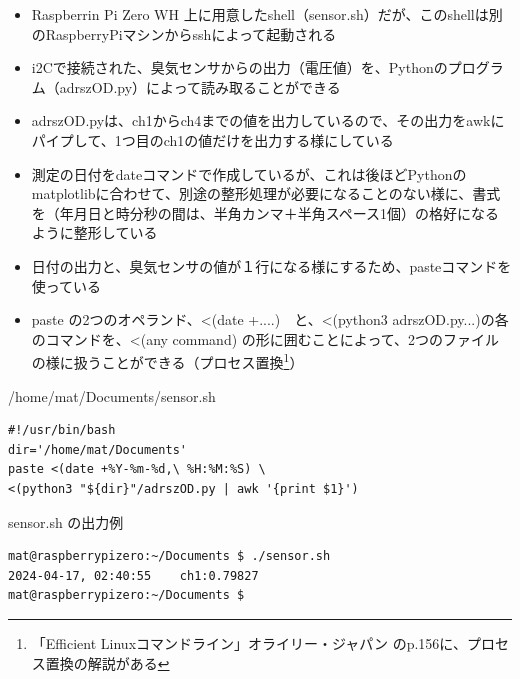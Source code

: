 \documentclass[12pt,a4paper,uplatex]{jsarticle}
\begin{document}
\begin{itemize}
	\item Raspberrin Pi Zero WH 上に用意したshell（sensor.sh）だが、このshellは別のRaspberryPiマシンからsshによって起動される
	\item i2Cで接続された、臭気センサからの出力（電圧値）を、Pythonのプログラム（adrszOD.py）によって読み取ることができる
	\item adrszOD.pyは、ch1からch4までの値を出力しているので、その出力をawkにパイプして、1つ目のch1の値だけを出力する様にしている
	\item 測定の日付をdateコマンドで作成しているが、これは後ほどPythonのmatplotlibに合わせて、別途の整形処理が必要になることのない様に、書式を（年月日と時分秒の間は、半角カンマ＋半角スペース1個）の格好になるように整形している
	\item 日付の出力と、臭気センサの値が１行になる様にするため、pasteコマンドを使っている
	\item paste の2つのオペランド、<(date +....)　と、<(python3 adrszOD.py...)の各のコマンドを、<(any command) の形に囲むことによって、2つのファイルの様に扱うことができる（プロセス置換\footnote{「Efficient Linuxコマンドライン」オライリー・ジャパン のp.156に、プロセス置換の解説がある}）
\end{itemize}

\begin{itembox}[l]{/home/mat/Documents/sensor.sh}
	\begin{verbatim}
#!/usr/bin/bash
dir='/home/mat/Documents'
paste <(date +%Y-%m-%d,\ %H:%M:%S) \
<(python3 "${dir}"/adrszOD.py | awk '{print $1}')
	\end{verbatim}
\end{itembox}

\begin{itembox}[l]{sensor.sh の出力例}
	\begin{verbatim}
mat@raspberrypizero:~/Documents $ ./sensor.sh 
2024-04-17, 02:40:55	ch1:0.79827
mat@raspberrypizero:~/Documents $ 
	\end{verbatim}
\end{itembox}
\end{document}
